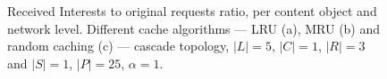\begin{figure}[h!]
    \centering



    \cprotect\caption{Received Interests to original requests ratio, per content 
        object and network level. Different cache algorithms --- LRU (a), MRU (b) and 
        random caching (c) --- cascade topology, $|L| = 5$, $|C| = 1$, 
        $|R| = 3$ and $|S| = 1$, $|P| = 25$, $\alpha = 1$.}
    \label{fig:exp-results-latency-cascade}

\end{figure}

